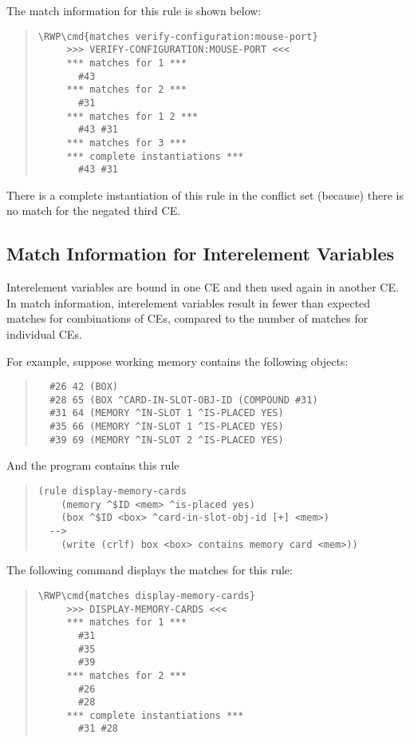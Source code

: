 The match information for this rule is shown below:

\begin{quote}
\begin{Verbatim}[commandchars=\\\{\}]
\RWP\cmd{matches verify-configuration:mouse-port}
     >>> VERIFY-CONFIGURATION:MOUSE-PORT <<<
     *** matches for 1 ***
       #43
     *** matches for 2 ***
       #31
     *** matches for 1 2 ***
       #43 #31
     *** matches for 3 ***
     *** complete instantiations ***
       #43 #31
\end{Verbatim}
\end{quote}

There is a complete instantiation of this rule in the conflict set
(because) there is no match for the negated third CE.

\subsection{Match Information for Interelement Variables}

Interelement variables are bound in one CE and then used again in
another CE. In match information, interelement variables result in
fewer than expected matches for combinations of CEs, compared to the
number of matches for individual CEs.

For example, suppose working memory contains the following objects:

\begin{quote}
\begin{verbatim}
  #26 42 (BOX)
  #28 65 (BOX ^CARD-IN-SLOT-OBJ-ID (COMPOUND #31)
  #31 64 (MEMORY ^IN-SLOT 1 ^IS-PLACED YES)
  #35 66 (MEMORY ^IN-SLOT 1 ^IS-PLACED YES)
  #39 69 (MEMORY ^IN-SLOT 2 ^IS-PLACED YES)
\end{verbatim}
\end{quote}

And the program contains this rule

\begin{quote}
\begin{verbatim}
(rule display-memory-cards
    (memory ^$ID <mem> ^is-placed yes)
    (box ^$ID <box> ^card-in-slot-obj-id [+] <mem>)
  -->
    (write (crlf) box <box> contains memory card <mem>))
\end{verbatim}
\end{quote}

The following command displays the matches for this rule:

\begin{quote}
\begin{Verbatim}[commandchars=\\\{\}]
\RWP\cmd{matches display-memory-cards}
     >>> DISPLAY-MEMORY-CARDS <<<
     *** matches for 1 ***
       #31
       #35
       #39
     *** matches for 2 ***
       #26
       #28
     *** complete instantiations ***
       #31 #28
\end{Verbatim}
\end{quote}

